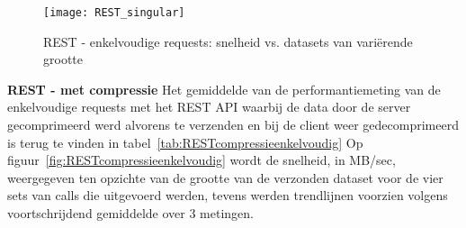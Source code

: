 \begin{figure}[ht]
    \centering
    \texttt{[image: REST\_singular]}
    \caption{REST - enkelvoudige requests: snelheid vs. datasets van vari\"erende grootte}
    \label{fig:RESTenkelvoudig}
\end{figure}

\textbf{REST - met compressie}\newline
Het gemiddelde van de performantiemeting van de enkelvoudige requests met het REST API waarbij de data door de server gecomprimeerd werd alvorens te verzenden
en bij de client weer gedecomprimeerd is terug te vinden in tabel~\ref{tab:RESTcompressieenkelvoudig}
Op figuur~\ref{fig:RESTcompressieenkelvoudig} wordt de snelheid, in MB/sec, weergegeven ten opzichte van de grootte van de verzonden dataset voor de vier sets van
calls die uitgevoerd werden, tevens werden trendlijnen voorzien volgens voortschrijdend gemiddelde over 3 metingen.\\

